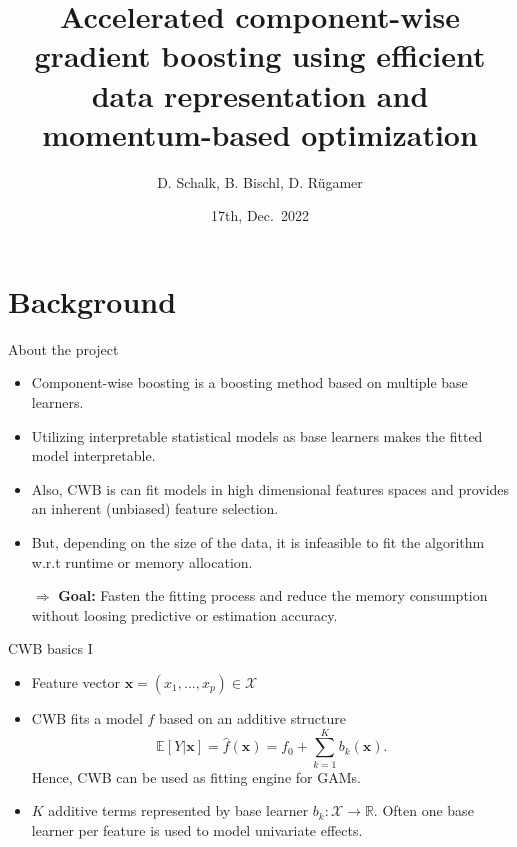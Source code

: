 \documentclass[ignorenonframetext,]{beamer}
\title{Accelerated component-wise gradient boosting using efficient data
representation and momentum-based optimization}
\author{D. Schalk, B. Bischl, D. Rügamer}
\date{17th, Dec.~2022}
\providecommand{\tightlist}{%
  \setlength{\itemsep}{0pt}\setlength{\parskip}{0pt}}
\newcommand{\fh}{\hat{f}}
\begin{document}
\begin{frame}[plain]
\titlepage
\end{frame}


\hypertarget{background}{%
\section{Background}\label{background}}

\begin{frame}{About the project}
\protect\hypertarget{about-the-project}{}
\begin{itemize}
\tightlist
\item
  Component-wise boosting
  \citep[CWB;][]{buhlmann2003boosting,buhlmann2007boosting} is a
  boosting method based on multiple base learners.
\item
  Utilizing interpretable statistical models as base learners makes the
  fitted model interpretable.
\item
  Also, CWB is can fit models in high dimensional features spaces and
  provides an inherent (unbiased) feature selection.
\item
  But, depending on the size of the data, it is infeasible to fit the
  algorithm w.r.t runtime or memory allocation.
\end{itemize}

\begin{itemize}
\item[$\Rightarrow$] \textbf{Goal:} Fasten the fitting process and reduce the memory consumption without loosing predictive or estimation accuracy.
\end{itemize}
\end{frame}

\begin{frame}{CWB basics I}
\protect\hypertarget{cwb-basics-i}{}
\begin{itemize}
\tightlist
\item
  Feature vector \(\bm{x} = (x_1, \dots, x_p)\in\mathcal{X}\)
\item
  CWB fits a model \(\fh\) based on an additive structure
  \[\mathbb{E}[Y|\bm{x}] = \fh(\bm{x}) = f_0 + \sum_{k=1}^K b_k(\bm{x}).\]
  Hence, CWB can be used as fitting engine for GAMs.
\item
  \(K\) additive terms represented by base learner
  \(b_k : \mathcal{X} \to \mathbb{R}\). Often one base learner per
  feature is used to model univariate effects.
\end{itemize}
\end{frame}
\end{document}
